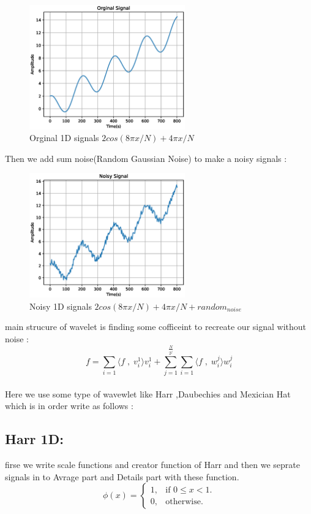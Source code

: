 \documentclass[12pt]{article}
\begin{document}
\begin{figure}[h]
    \centering
    \includegraphics[width=0.6\textwidth]{img/Harr_org.eps}
    \caption{Orginal 1D signals $2cos( {8 \pi x}/N ) + {4 \pi x}/N$}
    \label{fig:mesh1}
\end{figure}
\newpage
Then we add sum noise(Random Gaussian Noise) to make a noisy signals : 
\begin{figure}[h]
    \centering
    \includegraphics[width=0.6\textwidth]{img/Noisy_Signal.eps}
    \caption{Noisy 1D signals $2cos( {8 \pi x}/N ) + {4 \pi x}/N + random_{noise}$}
    \label{fig:mesh1}
\end{figure}
main strucure of wavelet is finding some cofficeint to recreate our signal without noise :
\[ f =\sum\limits_{i=1} \langle f \; , \; v^1_{i} \rangle v^1_{i} +  \sum\limits_{j=1}^{\frac{N}{2^j}}\sum\limits_{i=1}  \langle f \; , \; w^j_{i} \rangle w^j_{i} \] \\
Here we use some type of wavewlet like Harr ,Daubechies and Mexician Hat which is in order write as follows : 
\newpage
\subsection{Harr 1D:}
firse we write scale functions and creator function of Harr and then we seprate signals in to Avrage part and Details part with these function.\\
\begin{equation}
  \phi(x)=\begin{cases}
    1, & \text{if $0 \le x<1$}.\\
    0, & \text{otherwise}.
  \end{cases}
\end{equation} 
\end{document}
